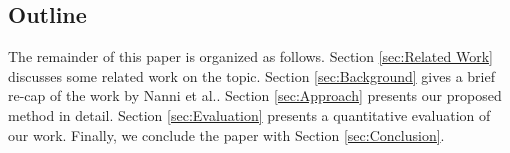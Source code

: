 \subsection{Outline}

The remainder of this paper is organized as follows. Section \ref{sec:Related Work} discusses some related work on the topic. Section \ref{sec:Background} gives a brief re-cap of the work by Nanni et al.\cite{nanni2018entity}.
Section \ref{sec:Approach} presents our proposed method in detail. Section \ref{sec:Evaluation} presents a quantitative evaluation of our work. Finally, we conclude the paper with Section \ref{sec:Conclusion}.
